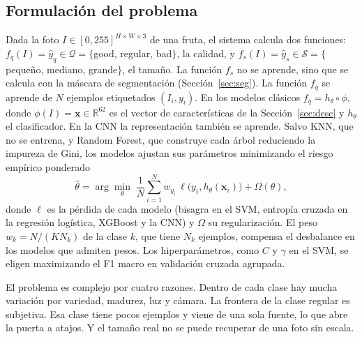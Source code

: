 \documentclass[conference]{IEEEtran}
\begin{document}
\subsection{Formulación del problema}
Dada la foto $I\in[0,255]^{H\times W\times 3}$ de una fruta, el sistema calcula dos funciones: $f_q(I)=\hat y_q\in\mathcal{Q}=\{$good, regular, bad$\}$, la calidad, y $f_s(I)=\hat y_s\in\mathcal{S}=\{$pequeño, mediano, grande$\}$, el tamaño. La función $f_s$ no se aprende, sino que se calcula con la máscara de segmentación (Sección~\ref{sec:seg}). La función $f_q$ se aprende de $N$ ejemplos etiquetados $(I_i,y_i)$. En los modelos clásicos $f_q=h_\theta\circ\phi$, donde $\phi(I)=\mathbf{x}\in\mathbb{R}^{62}$ es el vector de características de la Sección~\ref{sec:desc} y $h_\theta$ el clasificador. En la CNN la representación también se aprende. Salvo KNN, que no se entrena, y Random Forest, que construye cada árbol reduciendo la impureza de Gini, los modelos ajustan sus parámetros minimizando el riesgo empírico ponderado
\begin{equation}
\hat\theta=\arg\min_\theta\;\frac{1}{N}\sum_{i=1}^{N} w_{y_i}\,\ell\big(y_i,h_\theta(\mathbf{x}_i)\big)+\Omega(\theta),
\label{eq:erm}
\end{equation}
donde $\ell$ es la pérdida de cada modelo (bisagra en el SVM, entropía cruzada en la regresión logística, XGBoost y la CNN) y $\Omega$ su regularización. El peso $w_k=N/(KN_k)$ de la clase $k$, que tiene $N_k$ ejemplos, compensa el desbalance en los modelos que admiten pesos. Los hiperparámetros, como $C$ y $\gamma$ en el SVM, se eligen maximizando el F1 macro en validación cruzada agrupada.

El problema es complejo por cuatro razones. Dentro de cada clase hay mucha variación por variedad, madurez, luz y cámara. La frontera de la clase regular es subjetiva. Esa clase tiene pocos ejemplos y viene de una sola fuente, lo que abre la puerta a atajos. Y el tamaño real no se puede recuperar de una foto sin escala.
\end{document}
